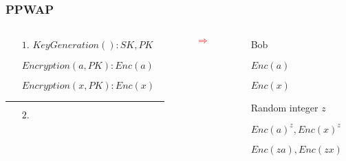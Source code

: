 \documentclass[xcolor=table]{beamer}
\newcommand{\red}[1]{\textcolor{red}{#1}}
\begin{document}
\begin{frame}
\frametitle{PPWAP}
\begin{columns}

\begin{column}{6cm}
\begin{itemize} \itemsep1pt \parskip0pt 
  \item[] \hspace{16mm}{Alice} \newline
  \item[$1.$] $KeyGeneration(): SK, PK$
  \item[] $Encryption(a ,PK): Enc(a)$
  \item[] $Encryption(x ,PK): Enc(x)$
\end{itemize}
\noindent\rule{12cm}{0.4pt}
\begin{itemize} \itemsep1pt \parskip0pt 
  \item[$2.$] 
\end{itemize}
\end{column}
\begin{column}{1cm}
\begin{itemize} \itemsep1pt \parskip0pt 
  \item[] \red{\Huge $\Rightarrow $}
\end{itemize}
\vspace{1 cm}
\end{column}
\begin{column}{4cm}

\begin{itemize} \itemsep1pt \parskip0pt 
  \item[] 
  \item[] 
  \item[] Bob
  \item[]
  \item[] $Enc(a)$
  \item[] $Enc(x)$
\end{itemize}
\vspace{6mm}
\begin{itemize} \itemsep1pt \parskip0pt 
  \item[] Random integer $z$
  \item[] $Enc(a)^z, Enc(x)^z$
  \item[] $Enc(za), Enc(zx)$
\end{itemize}
\end{column}
\end{columns}

\end{frame}
\end{document}
